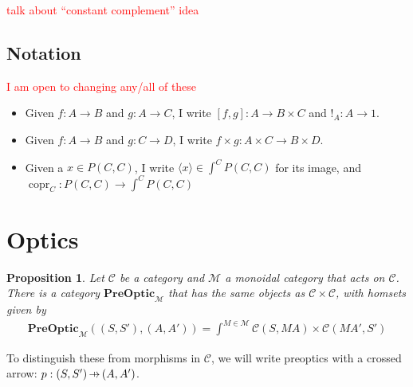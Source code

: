 \documentclass[11pt,a4paper]{article}
\theoremstyle{plain}
\newtheorem{proposition}[theorem]{Proposition}
\theoremstyle{definition}
\newcommand{\C}{\mathscr{C}}
\newcommand{\M}{\mathscr{M}}
\newcommand{\PreOptic}{\mathbf{PreOptic}}
\DeclareMathOperator{\copr}{copr}
\newcommand{\hto}{\ensuremath{\,\mathaccent\shortmid\rightarrow\,}}
\newcommand{\todo}[1]{\textcolor{red}{\small #1}}
\begin{document}
\todo{talk about ``constant complement'' idea}

\subsection{Notation}
\todo{I am open to changing any/all of these}
\begin{itemize}
\item Given $f : A \to B$ and $g : A \to C$, I write $[f, g] : A \to B \times C$ and $!_A : A \to 1$.
\item Given $f : A \to B$ and $g : C \to D$, I write $f \times g : A \times C \to B \times D$.
\item Given a $x \in P(C, C)$, I write $\langle x \rangle \in \int^C P(C, C)$ for its image, and $\copr_C : P(C,C) \to \int^C P(C, C)$
\end{itemize}
\section{Optics}

\begin{proposition}
Let $\C$ be a category and $\M$ a monoidal category that acts on $\C$. There is a category $\PreOptic_\M$ that has the same objects as $\C \times \C$, with homsets given by
\begin{align*}
\PreOptic_\M((S, S'), (A, A')) = \int^{M \in \M} \C(S, M A) \times \C(M A', S')
\end{align*}
\end{proposition}
To distinguish these from morphisms in $\C$, we will write preoptics with a crossed arrow: $p : (S, S') \hto (A, A')$.
\end{document}
